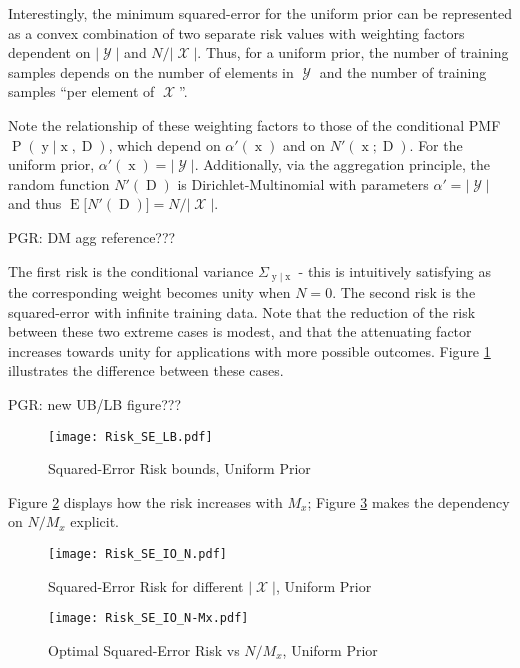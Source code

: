 \documentclass[12pt]{report}
\DeclareMathOperator{\xrm}{\mathrm{x}}
\DeclareMathOperator{\yrm}{\mathrm{y}}
\DeclareMathOperator{\Drm}{\mathrm{D}}
\DeclareMathOperator{\Prm}{\mathrm{P}}
\DeclareMathOperator{\Erm}{\mathrm{E}}
\DeclareMathOperator{\Xcal}{\mathcal{X}}
\DeclareMathOperator{\Ycal}{\mathcal{Y}}
\begin{document}
Interestingly, the minimum squared-error for the uniform prior can be represented as a convex combination of two separate risk values with weighting factors dependent on $|\Ycal|$ and $N/|\Xcal|$. Thus, for a uniform prior, the number of training samples depends  on the number of elements in $\Ycal$ and the number of training samples ``per element of $\Xcal$''.

Note the relationship of these weighting factors to those of the conditional PMF $\Prm(\yrm | \xrm,\Drm)$, which depend on $\alpha'(\xrm)$ and on $N'(\xrm;\Drm)$. For the uniform prior, $\alpha'(\xrm) = |\Ycal|$. Additionally, via the aggregation principle, the random function $N'(\Drm)$ is Dirichlet-Multinomial with parameters $\alpha' = |\Ycal|$ and thus $\Erm\big[ N'(\Drm) \big] = N/|\Xcal|$.

PGR: DM agg reference???

The first risk is the conditional variance $\Sigma_{\yrm|\xrm}$ - this is intuitively satisfying as the corresponding weight becomes unity when $N=0$. The second risk is the squared-error with infinite training data. Note that the reduction of the risk between these two extreme cases is modest, and that the attenuating factor increases towards unity for applications with more possible outcomes. Figure \ref{fig:Risk_SE_LB} illustrates the difference between these cases.

PGR: new UB/LB figure???

\begin{figure}
\centering
\texttt{[image: Risk\_SE\_LB.pdf]}
\caption{Squared-Error Risk bounds, Uniform Prior}
\label{fig:Risk_SE_LB}
\end{figure}

Figure \ref{fig:Risk_SE_IO_N} displays how the risk increases with $M_x$; Figure \ref{fig:Risk_SE_IO_N-Mx} makes the dependency on $N/M_x$ explicit.

\begin{figure}
\centering
\texttt{[image: Risk\_SE\_IO\_N.pdf]}
\caption{Squared-Error Risk for different $|\Xcal|$, Uniform Prior}
\label{fig:Risk_SE_IO_N}
\end{figure}

\begin{figure}
\centering
\texttt{[image: Risk\_SE\_IO\_N-Mx.pdf]}
\caption{Optimal Squared-Error Risk vs $N/M_x$, Uniform Prior}
\label{fig:Risk_SE_IO_N-Mx}
\end{figure}
\end{document}
